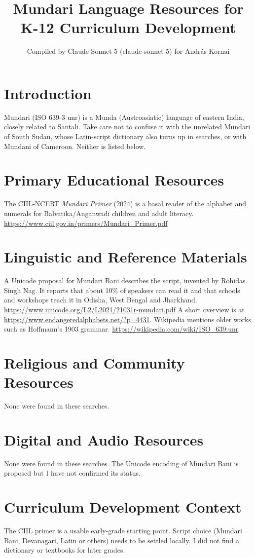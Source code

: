 \documentclass[12pt]{article}
\title{Mundari Language Resources for K-12 Curriculum Development}
\author{Compiled by Claude Sonnet 5 (claude-sonnet-5) for Andr\'as Kornai}
\date{}
\begin{document}
\maketitle
\section{Introduction}
Mundari (ISO 639-3 unr) is a Munda (Austroasiatic) language of eastern India, closely related to Santali. Take care not to confuse it with the unrelated Mundari of South Sudan, whose Latin-script dictionary also turns up in searches, or with Mundani of Cameroon. Neither is listed below.
\section{Primary Educational Resources}
The CIIL-NCERT \emph{Mundari Primer} (2024) is a basal reader of the alphabet and numerals for Balvatika/Anganwadi children and adult literacy. \url{https://www.ciil.gov.in/primers/Mundari_Primer.pdf}
\section{Linguistic and Reference Materials}
A Unicode proposal for Mundari Bani describes the script, invented by Rohidas Singh Nag. It reports that about 10\% of speakers can read it and that schools and workshops teach it in Odisha, West Bengal and Jharkhand. \url{https://www.unicode.org/L2/L2021/21031r-mundari.pdf} A short overview is at \url{https://www.endangeredalphabets.net/?p=4431}. Wikipedia mentions older works such as Hoffmann's 1903 grammar. \url{https://wikipedia.com/wiki/ISO_639:unr}
\section{Religious and Community Resources}
None were found in these searches.
\section{Digital and Audio Resources}
None were found in these searches. The Unicode encoding of Mundari Bani is proposed but I have not confirmed its status.
\section{Curriculum Development Context}
The CIIL primer is a usable early-grade starting point. Script choice (Mundari Bani, Devanagari, Latin or others) needs to be settled locally. I did not find a dictionary or textbooks for later grades.
\end{document}
